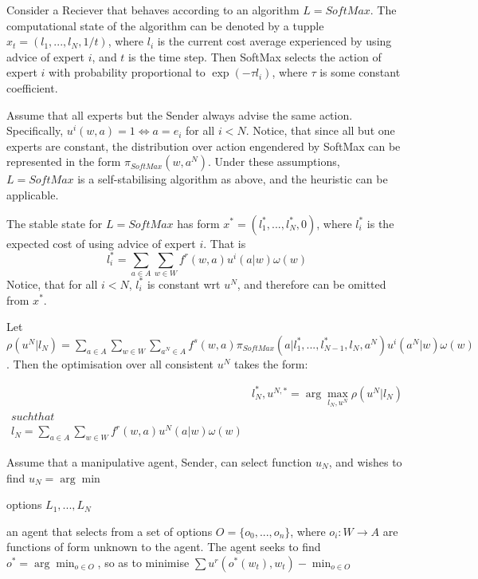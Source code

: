 \documentclass{article}
\begin{document}
Consider a Reciever that behaves according to an algorithm
$L=SoftMax$. The computational state of the algorithm can be denoted
by a tupple $x_t=(l_1,...,l_N,1/t)$, where $l_i$ is the current cost
average experienced by using advice of expert $i$, and $t$ is the time
step. Then SoftMax selects the action of expert $i$ with probability
proportional to $\exp(-\tau l_i)$, where $\tau$ is some constant
coefficient.

Assume that all experts but the Sender always advise the same
action. Specifically, $u^i(w,a)=1 \iff a=e_i$ for all $i<N$. Notice,
that since all but one experts are constant, the distribution over
action engendered by SoftMax can be represented in the form
$\pi_{SoftMax}(w,a^N)$. Under these assumptions, $L=SoftMax$ is a self-stabilising algorithm as above, and the heuristic can be applicable. 


The stable state for $L=SoftMax$ has form $x^*=(l_1^*,...,l_N^*,0)$, where $l_i^*$ is the expected cost of using advice of expert $i$. That is 
$$
l_i^*=\sum\limits_{a\in A}\sum\limits_{w\in W}f^r(w,a)u^i(a|w)\omega(w)
$$ Notice, that for all $i<N$, $l_i^*$ is constant wrt $u^N$, and therefore can be omitted from $x^*$.

Let $\rho(u^N|l_N)=\sum\limits_{a\in A}\sum\limits_{w\in W}\sum\limits_{a^N\in A}
f^s(w,a)\pi_{SoftMax}(a|l_1^*,...,l_{N-1}^*,l_N,a^N)u^i(a^N|w)\omega(w)$. Then the optimisation over all consistent $u^N$ takes the form:

\begin{eqnarray*}
&l_N^*,u^{N,*}=\arg\max\limits_{l_N,u^N}\rho(u^N|l_N)\\
\displaystyle{such that}\\
l_N=\sum\limits_{a\in A}\sum\limits_{w\in W}f^r(w,a)u^N(a|w)\omega(w)
\end{eqnarray*}


Assume that a manipulative agent, Sender, can select function $u_N$, and wishes to find $u_N=\arg\min $



options $L_1,...,L_N$

an agent that selects from a set of options $O=\{o_0,...,o_n\}$, where $o_i:W\rightarrow A$ are functions of form unknown to the agent. The agent seeks to find $o^*=\arg\min_{o\in O} $, so as to minimise $\sum u^r(o^*(w_t),w_t)-\min_{o\in O} $
\end{document}
